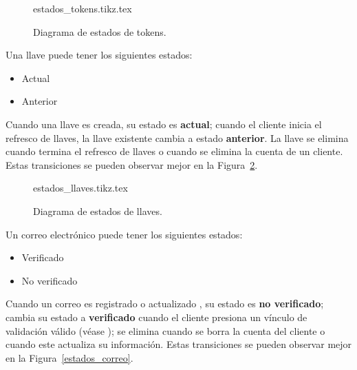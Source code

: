 \begin{figure}
  \begin{center}
    {estados_tokens.tikz.tex}
    \caption{Diagrama de estados de tokens.}
    \label{estados_token}
  \end{center}
\end{figure}

{
  Una llave puede tener los siguientes estados:
  \begin{itemize}
    \item Actual
    \item Anterior
  \end{itemize}

  \begin{hangparas}{2em}{0}
    Cuando una llave es creada, su estado es \textbf{actual}; cuando el cliente
    inicia el refresco de llaves, la llave existente cambia a estado
    \textbf{anterior}. La llave se elimina cuando termina el refresco de llaves
    o cuando se elimina la cuenta de un cliente. Estas transiciones se pueden
    observar mejor en la Figura~\ref{estados_llave}.
  \end{hangparas}
}

\begin{figure}
  \begin{center}
    {estados_llaves.tikz.tex}
    \caption{Diagrama de estados de llaves.}
    \label{estados_llave}
  \end{center}
\end{figure}

{
  Un correo electrónico puede tener los siguientes estados:
  \begin{itemize}
    \item Verificado
    \item No verificado
  \end{itemize}

  \begin{hangparas}{2em}{0}
    Cuando un correo es registrado o actualizado , su estado es \textbf{no
    verificado}; cambia su estado a \textbf{verificado} cuando el cliente
    presiona un vínculo de validación válido (véase
    ); se elimina cuando se
    borra la cuenta del cliente o cuando este actualiza su información. Estas
    transiciones se pueden observar mejor en la Figura~\ref{estados_correo}.
  \end{hangparas}
}

